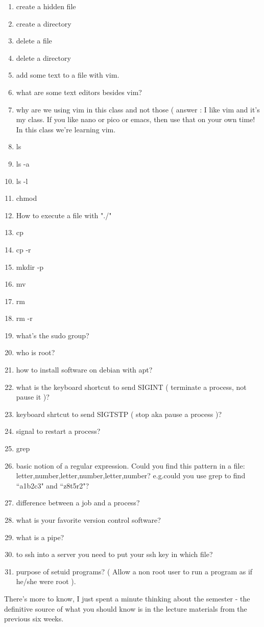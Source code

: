 \documentclass[12pt,a4paper]{article}
\begin{document}
\begin{multicols}{2}
\begin{enumerate}
\setlength\itemsep{0em}
\item create a hidden file
\item create a directory
\item delete a file
\item delete a directory
\item add some text to a file with vim.
\item what are some text editors besides vim?
\item why are we using vim in this class and not those ( answer : I like vim and
it's my class. If you like nano or pico or emacs, then use that on your own
time! In this class we're learning vim.
\item ls
\item ls -a
\item ls -l
\item chmod
\item How to execute a file with "./"
\item cp
\item cp -r
\item mkdir -p
\item mv
\item rm 
\item rm -r
\item what's the sudo group?
\item who is root?
\item how to install software on debian with apt?
\item what is the keyboard shortcut to send SIGINT ( terminate a process, not
pause it )?
\item keyboard shrtcut to send SIGTSTP ( stop aka pause a process )?
\item signal to restart a process?
\item grep
\item basic notion of a regular expression. Could you find this pattern in a
file: letter,number,letter,number,letter,number? e.g.could you use grep to find
``a1b2c3" and ``z8t5r2"?
\item difference between a job and a process?
\item what is your favorite version control software?
\item what is a pipe?
\item to ssh into a server you need to put your ssh key in which file?
\item purpose of setuid programs? ( Allow a non root user to run a program as if
he/she were root ).
\end{enumerate}
\end{multicols}
There's more to know, I just spent a minute thinking about the semester - the
definitive source of what you should know is in the lecture materials from the
previous six weeks.
\end{document}

